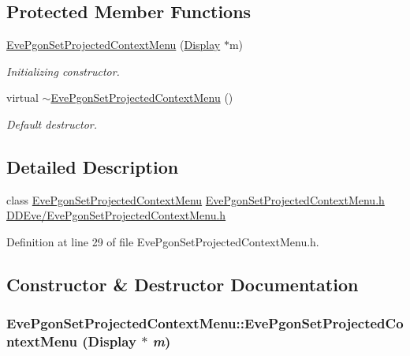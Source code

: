 \subsection*{Protected Member Functions}
\begin{DoxyCompactItemize}
\item 
\hyperlink{class_d_d4hep_1_1_eve_pgon_set_projected_context_menu_abb2c75b86df13a70ed20d3d14c7b6416}{EvePgonSetProjectedContextMenu} (\hyperlink{class_d_d4hep_1_1_display}{Display} $\ast$m)
\begin{DoxyCompactList}\small\item\em Initializing constructor. \item\end{DoxyCompactList}\item 
virtual \hyperlink{class_d_d4hep_1_1_eve_pgon_set_projected_context_menu_a2872930488e4ef2ef159f765acaea703}{$\sim$EvePgonSetProjectedContextMenu} ()
\begin{DoxyCompactList}\small\item\em Default destructor. \item\end{DoxyCompactList}\end{DoxyCompactItemize}


\subsection{Detailed Description}
class \hyperlink{class_d_d4hep_1_1_eve_pgon_set_projected_context_menu}{EvePgonSetProjectedContextMenu} \hyperlink{_eve_pgon_set_projected_context_menu_8h}{EvePgonSetProjectedContextMenu.h} \hyperlink{_eve_pgon_set_projected_context_menu_8h}{DDEve/EvePgonSetProjectedContextMenu.h} 

Definition at line 29 of file EvePgonSetProjectedContextMenu.h.

\subsection{Constructor \& Destructor Documentation}
\hypertarget{class_d_d4hep_1_1_eve_pgon_set_projected_context_menu_abb2c75b86df13a70ed20d3d14c7b6416}{
\subsubsection[{EvePgonSetProjectedContextMenu}]{\setlength{\rightskip}{0pt plus 5cm}EvePgonSetProjectedContextMenu::EvePgonSetProjectedContextMenu ({\bf Display} $\ast$ {\em m})}}
\label{class_d_d4hep_1_1_eve_pgon_set_projected_context_menu_abb2c75b86df13a70ed20d3d14c7b6416}


